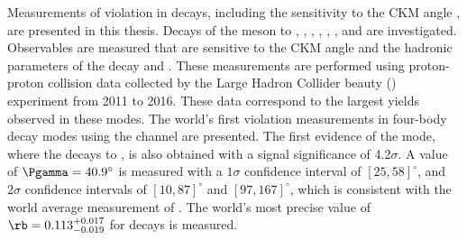 
Measurements of \CP violation in \btodkst decays, including the sensitivity to the CKM angle \Pgamma, are presented in this thesis. Decays of the \Dz meson to \Km\pip, \Km\Kp, \pim\pip, \pim\Kp, \Km\pip\pim\pip, \pim\pip\pim\pip, and \pim\Kp\pim\pip are investigated. Observables are measured that are sensitive to the CKM angle \Pgamma and the hadronic parameters of the decay \rb and \deltab. These measurements are performed using proton-proton collision data collected by the Large Hadron Collider beauty (\lhcb) experiment from 2011 to 2016. These data correspond to the largest yields observed in these modes. The world's first \CP violation measurements in four-body \Dz decay modes using the \btodkst channel are presented. The first evidence of the \btodkst mode, where the \Dz decays to \pim\Kp, is also obtained with a signal significance of 4.2$\sigma$. A value of $\Pgamma = 40.9^{\circ}$ is measured with a $1\sigma$ confidence interval of $[25, 58]^{\circ}$, and $2\sigma$ confidence intervals of $[10, 87]^{\circ}$ and $[97,167]^{\circ}$, which is consistent with the world average measurement of \Pgamma. The world's most precise value of $\rb = 0.113^{+0.017}_{-0.019}$ for \btodkst decays is measured.
